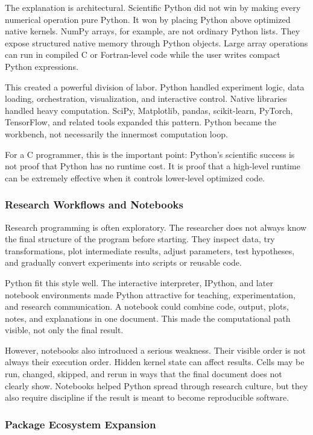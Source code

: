 The explanation is architectural. Scientific Python did not win by making every numerical operation pure Python. It won by placing Python above optimized native kernels. NumPy arrays, for example, are not ordinary Python lists. They expose structured native memory through Python objects. Large array operations can run in compiled C or Fortran-level code while the user writes compact Python expressions.

This created a powerful division of labor. Python handled experiment logic, data loading, orchestration, visualization, and interactive control. Native libraries handled heavy computation. SciPy, Matplotlib, pandas, scikit-learn, PyTorch, TensorFlow, and related tools expanded this pattern. Python became the workbench, not necessarily the innermost computation loop.

For a C programmer, this is the important point: Python's scientific success is not proof that Python has no runtime cost. It is proof that a high-level runtime can be extremely effective when it controls lower-level optimized code.

\subsubsection{Research Workflows and Notebooks}

Research programming is often exploratory. The researcher does not always know the final structure of the program before starting. They inspect data, try transformations, plot intermediate results, adjust parameters, test hypotheses, and gradually convert experiments into scripts or reusable code.

Python fit this style well. The interactive interpreter, IPython, and later notebook environments made Python attractive for teaching, experimentation, and research communication. A notebook could combine code, output, plots, notes, and explanations in one document. This made the computational path visible, not only the final result.

However, notebooks also introduced a serious weakness. Their visible order is not always their execution order. Hidden kernel state can affect results. Cells may be run, changed, skipped, and rerun in ways that the final document does not clearly show. Notebooks helped Python spread through research culture, but they also require discipline if the result is meant to become reproducible software.

\subsubsection{Package Ecosystem Expansion}

